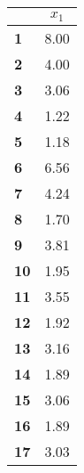 \begin{small}\begin{tabular}{|l|c|}
\hline
&\textbf{$x_1$}\\\hline
\textbf{1}&8.00\\\hline
\textbf{2}&4.00\\\hline
\textbf{3}&3.06\\\hline
\textbf{4}&1.22\\\hline
\textbf{5}&1.18\\\hline
\textbf{6}&6.56\\\hline
\textbf{7}&4.24\\\hline
\textbf{8}&1.70\\\hline
\textbf{9}&3.81\\\hline
\textbf{10}&1.95\\\hline
\textbf{11}&3.55\\\hline
\textbf{12}&1.92\\\hline
\textbf{13}&3.16\\\hline
\textbf{14}&1.89\\\hline
\textbf{15}&3.06\\\hline
\textbf{16}&1.89\\\hline
\textbf{17}&3.03\\\hline
\end{tabular}
\end{small}